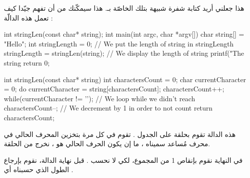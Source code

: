 هذا جعلني أريد كتابة شفرة شبيهة بتلك الخاصّة بـ. هذا سيمكّنك من أن تفهم جيّدا كيف تعمل هذه الدالّة :
\begin{Csource}
int stringLen(const char* string);
int main(int argc, char *argv[])
{
	char string[] = "Hello";
	int stringLength = 0;
	// We put the length of string in stringLength
	stringLength = stringLen(string);
	// We display the length of string
	printf("The string %
	return 0;
}

int stringLen(const char* string)
{
	int charactersCount = 0;
	char currentCharacter = 0;
	do
	{
    	 	currentCharacter = string[charactersCount];
    	 	charactersCount++;
	}
	while(currentCharacter != '\0'); // We loop while we didn’t reach \0
	charactersCount--; // We decrement by 1 in order to not count \0
	return charactersCount;
}
\end{Csource}
هذه الدالة
تقوم بحلقة على الجدول
.
تقوم في كل مرة بتخزين المحرف الحالي في محرف مُساعد سميناه
،
ما إن يكون الحرف الحالي هو
،
نخرج من الحلقة.

في النهاية نقوم بإنقاص 1 من المجموع، لكي لا نحسب
.
 قبل نهاية الدالة، نقوم بإرجاع الطول الذي حسبناه أي
.
